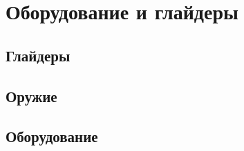 \documentclass[a4paper,12pt]{report}
\begin{document}
\begin{comment}
Сила антиграва
\begin{equation}
\label{antigrav_force}
\vec{F_a} =
\begin{cases}
0, & \quad \text{при } h_{g} > h_a \\
-m\vec{g}, & \quad \text{при } h_{g} = h_a \\
-m\vec{g}(1+ k_{add}), & \quad \text{при } h_{g} < h_a \\
\end{cases}
\end{equation}
где $h_{g}$ -- высота глайдера над поверхностью, $h_a$ -- уровень, на котором антиграв должен удерживать глайдер над землёй, $k_{add}$ -- коэффициент дополнительной подъёмной силы антиграва, препятствующей столкновению с землёй.
Сила антиграва направлена строго вверх.

При $h_g < h_a$ сила отталкивания тем больше, чем меньше расстояние до земли
\begin{equation}
k_{add} =\frac{h_{g}}{h_{a}}.
\end{equation}

Для обеспечения плавности снижения допустимо ввести силу антиграва при $h_{g} > h_a$. Таким образом, формула \eqref{antigrav_force} будет иметь вид

\begin{equation}
\vec{F_a} =
\begin{cases}
0, & \quad \text{при } h_{g} > k h_a \\
-m\vec{g}(1+ k_{add}), & \quad \text{при } h_{g} \le k h_a \\
\end{cases}
\end{equation}
где $k=2,3,\dots$. Примем $k=3$.
\end{comment}

\chapter{Оборудование и глайдеры}
\section{Глайдеры}
\section{Оружие}
\section{Оборудование}
\end{document}
